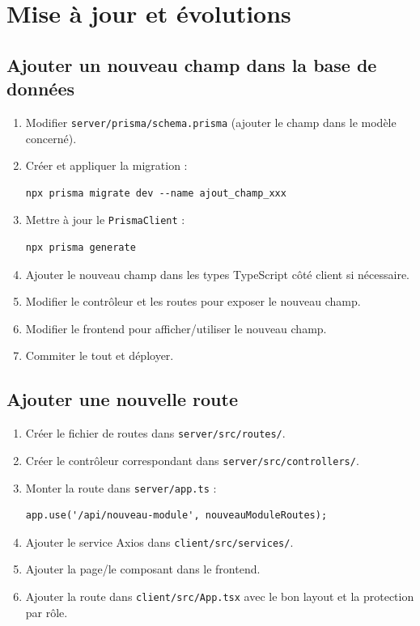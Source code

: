 \documentclass[12pt,a4paper]{report}
\begin{document}
\chapter{Mise à jour et évolutions}

\section{Ajouter un nouveau champ dans la base de données}
\begin{enumerate}
    \item Modifier \texttt{server/prisma/schema.prisma} (ajouter le champ dans le modèle concerné).
    \item Créer et appliquer la migration :
\begin{lstlisting}
npx prisma migrate dev --name ajout_champ_xxx
\end{lstlisting}
    \item Mettre à jour le \texttt{PrismaClient} :
\begin{lstlisting}
npx prisma generate
\end{lstlisting}
    \item Ajouter le nouveau champ dans les types TypeScript côté client si nécessaire.
    \item Modifier le contrôleur et les routes pour exposer le nouveau champ.
    \item Modifier le frontend pour afficher/utiliser le nouveau champ.
    \item Commiter le tout et déployer.
\end{enumerate}

\section{Ajouter une nouvelle route}
\begin{enumerate}
    \item Créer le fichier de routes dans \texttt{server/src/routes/}.
    \item Créer le contrôleur correspondant dans \texttt{server/src/controllers/}.
    \item Monter la route dans \texttt{server/app.ts} :
\begin{lstlisting}
app.use('/api/nouveau-module', nouveauModuleRoutes);
\end{lstlisting}
    \item Ajouter le service Axios dans \texttt{client/src/services/}.
    \item Ajouter la page/le composant dans le frontend.
    \item Ajouter la route dans \texttt{client/src/App.tsx} avec le bon layout et la protection par rôle.
\end{enumerate}
\end{document}
